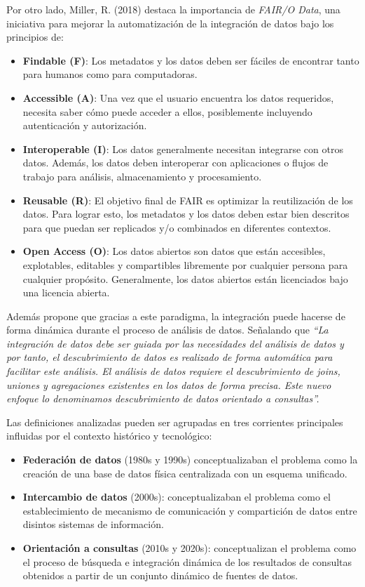 Por otro lado, Miller, R. (2018) \cite{miller2018open} destaca la importancia de \textit{FAIR/O Data}, una iniciativa
para mejorar la automatización de la integración de datos bajo los principios de:

\begin{itemize}
    \item \textbf{Findable (F)}: Los metadatos y los datos deben ser fáciles de encontrar tanto para humanos como para computadoras. 
    \item \textbf{Accessible (A)}: Una vez que el usuario encuentra los datos requeridos, necesita saber cómo puede acceder a ellos, posiblemente incluyendo autenticación y autorización.
    \item \textbf{Interoperable (I)}: Los datos generalmente necesitan integrarse con otros datos. Además, los datos deben interoperar con aplicaciones o flujos de trabajo para análisis, almacenamiento y procesamiento.
    \item \textbf{Reusable (R)}: El objetivo final de FAIR es optimizar la reutilización de los datos. Para lograr esto, los metadatos y los datos deben estar bien descritos para que puedan ser replicados y/o combinados en diferentes contextos.
    \item \textbf{Open Access (O)}: Los datos abiertos son datos que están accesibles, explotables, editables y compartibles libremente por cualquier persona para cualquier propósito. Generalmente, los datos abiertos están licenciados bajo una licencia abierta.
\end{itemize}


Además propone que gracias a este paradigma, la integración puede hacerse de forma dinámica durante el proceso de análisis de datos. 
Señalando que \textit{``La integración de datos debe ser guiada
por las necesidades del análisis de datos y por tanto, el descubrimiento de datos es realizado de forma automática para facilitar este análisis.
El análisis de datos requiere el descubrimiento de joins, uniones y agregaciones existentes en los datos de forma
precisa. Este nuevo enfoque lo denominamos descubrimiento de datos orientado a consultas''.}

Las definiciones analizadas pueden ser agrupadas en tres corrientes principales influidas
por el contexto histórico y tecnológico:
\begin{itemize}
    \item \textbf{Federación de datos} (1980s y 1990s) conceptualizaban el problema como la creación de una base de datos
    física centralizada con un esquema unificado.
    \item \textbf{Intercambio de datos} (2000s): conceptualizaban el problema como el establecimiento de mecanismo
    de comunicación y compartición de datos entre disintos sistemas de información.
    \item \textbf{Orientación a consultas} (2010s y 2020s): conceptualizan el problema como el proceso de búsqueda e integración
    dinámica de los resultados de consultas obtenidos a partir de un conjunto dinámico de fuentes de datos.
\end{itemize}

